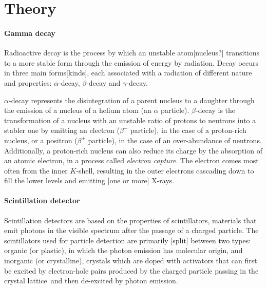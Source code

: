 \section{Theory}
\paragraph{Gamma decay}
Radioactive decay is the process by which an unstable atom[nucleus?] transitions to a more stable form through the emission of energy by radiation.
Decay occurs in three main forms[kinds], each associated with a radiation of different nature and properties: $\alpha$-decay, $\beta$-decay and $\gamma$-decay.

$\alpha$-decay represents the disintegration of a parent nucleus to a daughter through the emission of a nucleus of a helium atom (an $\alpha$ particle).
$\beta$-decay is the transformation of a nucleus with an unstable ratio of protons to neutrons into a stabler one by emitting an electron ($\beta^-$ particle), in the case of a proton-rich nucleus, or a positron ($\beta^+$ particle), in the case of an over-abundance of neutrons.
Additionally, a proton-rich nucleus can also reduce its charge by the absorption of an atomic electron, in a process called \emph{electron capture}.
The electron comes most often from the inner $K$-shell, resulting in the outer electrons cascading down to fill the lower levels and emitting [one or more] X-rays\cite{intro_nuclear_particle_physics}.

\paragraph{Scintillation detector}
Scintillation detectors are based on the properties of scintillators, materials that emit photons in the visible spectrum after the passage of a charged particle.
The scintillators used for particle detection are primarily [split] between two types: organic (or plastic), in which the photon emission has molecular origin, 
and inorganic (or crystalline), crystals which are doped with activators that can first be excited by electron-hole pairs 
produced by the charged particle passing in the crystal lattice\footnotemark\ and then de-excited by photon emission\cite{intro_nuclear_particle_physics}.

